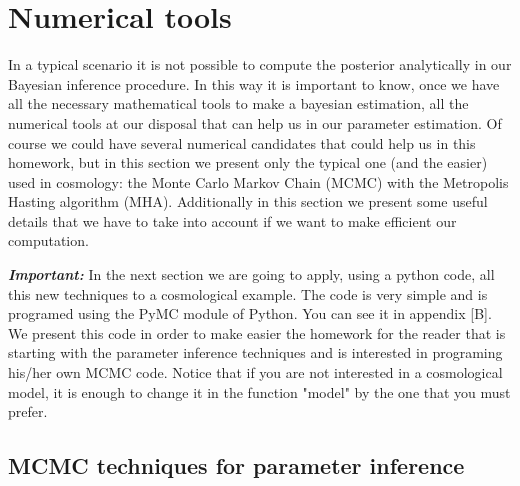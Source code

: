 \documentclass[onecolumn,           %
               showpacs,            %
               preprintnumbers,     %
               aps,                 %
               prl,          	    %
               letterpaper,             %
               superscriptaddress,      %
               nofootinbib,         %
               tightenlines,        %
               floats,floatfix      %
               ,usenatbib,
               ]{revtex4-1}
\begin{document}
%

\section{Numerical tools}

In a typical scenario it is not possible to compute the posterior analytically in our Bayesian inference procedure. In this way it is important to know, once we have all the necessary mathematical tools to make a bayesian estimation, all the numerical tools at our disposal that can help us in our parameter estimation. Of course we could have several numerical candidates that could help us in this homework, but in this section we present only the typical one (and the easier) used in cosmology: the Monte Carlo Markov Chain (MCMC) with the Metropolis Hasting algorithm (MHA). Additionally in this section we present some useful details that we have to take into account if we want to make efficient our computation. 

\textit{\textbf{Important:}} In the next section we are going to apply, using a python code, all this new techniques to a cosmological example. The code is very simple and is programed using the PyMC module of Python. You can see it in appendix [B]. We present this code in order to make easier the homework for the reader that is starting with the parameter inference techniques and is interested in programing his/her own MCMC code. Notice that if you are not interested in a cosmological model, it is enough to change it in the function "model" by the one that you must prefer. 

\subsection{MCMC techniques for parameter inference}
\end{document}

